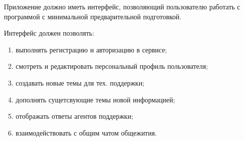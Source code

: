 Приложение должно иметь интерфейс, позволяющий пользователю работать с программой с минимальной предварительной подготовкой.

Интерфейс должен позволять:
\begin{enumerate}
    \item выполнять регистрацию и авторизацию в сервисе;
    \item смотреть и редактировать персональный профиль пользователя;
    \item создавать новые темы для тех. поддержки;
    \item дополнять сущетсвующие темы новой информацией;
    \item отображать ответы агентов поддержки;
    \item взаимодействовать с общим чатом общежития.
\end{enumerate}
